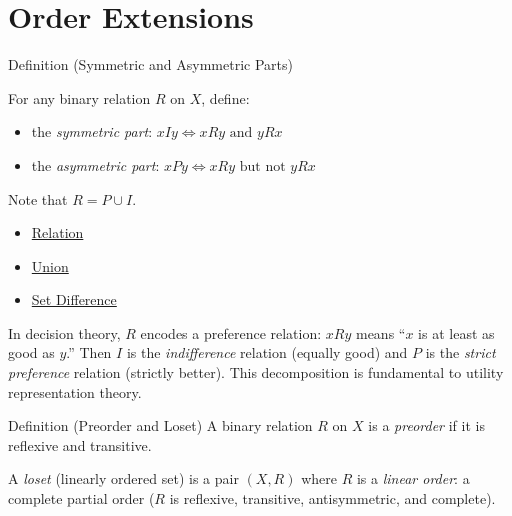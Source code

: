 
\section{Order Extensions}


\begin{definitionbox}{Definition (Symmetric and Asymmetric Parts)}
\begin{definition}\label{def:sym-asym}
For any binary relation $R$ on $X$, define:
\begin{itemize}
  \item the \emph{symmetric part}: $xIy \iff xRy \text{ and } yRx$
  \item the \emph{asymmetric part}: $xPy \iff xRy \text{ but not } yRx$
\end{itemize}
Note that $R = P \cup I$.
\end{definition}
\end{definitionbox}

\begin{dependencies}
\begin{itemize}
  \item \hyperref[def:relation]{Relation}
  \item \hyperref[def:union]{Union}
  \item \hyperref[def:set-difference]{Set Difference}
\end{itemize}
\end{dependencies}

\begin{remark*}
In decision theory, $R$ encodes a preference relation: $xRy$ means ``$x$ is
at least as good as $y$.'' Then $I$ is the \emph{indifference} relation
(equally good) and $P$ is the \emph{strict preference} relation (strictly
better). This decomposition is fundamental to utility representation theory.
\end{remark*}

\begin{propositionbox}{Definition (Preorder and Loset)}
\label{def:preorder-ext}
A binary relation $R$ on $X$ is a \emph{preorder} if it is reflexive and
transitive.

\medskip
\label{def:loset}
A \emph{loset} (linearly ordered set) is a pair $(X, R)$ where $R$ is a
\emph{linear order}: a complete partial order ($R$ is reflexive, transitive,
antisymmetric, and complete).
\end{propositionbox}

